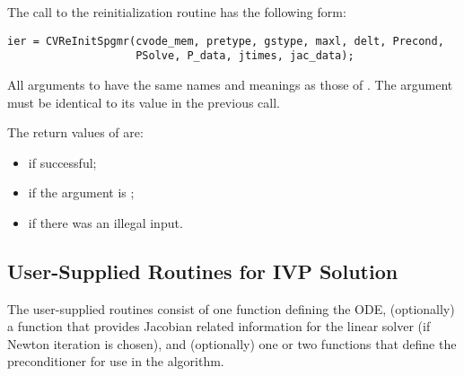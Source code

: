 \begin{itemize}
  The call to the {\cvspgmr} reinitialization routine has the following form:
\begin{verbatim}
ier = CVReInitSpgmr(cvode_mem, pretype, gstype, maxl, delt, Precond, 
                    PSolve, P_data, jtimes, jac_data);
\end{verbatim}
  All arguments to  have the same names and meanings
  as those of .  The  argument must be identical 
  to its value in the previous  call.                     
  
  The return values of  are:
  \begin{itemize}
  \item {} if successful;
  \item {} if the  argument is ;
  \item {} if there was an illegal input.
  \end{itemize}         

\end{itemize}

                                                                 
\subsection{User-Supplied Routines for IVP Solution}\label{ss:user_fct_sim}

The user-supplied routines consist of one function defining the ODE, 
(optionally) a function that provides Jacobian related information for the linear 
solver (if Newton iteration is chosen), and (optionally) one or two functions 
that define the preconditioner for use in the {\spgmr} algorithm. 

